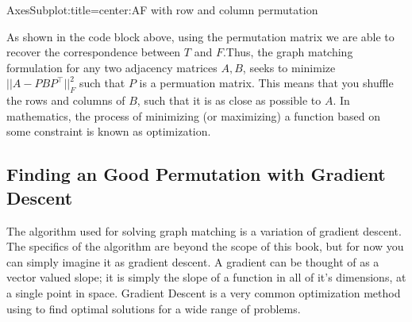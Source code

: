 \documentclass[letterpaper,10pt,english]{jupyterBook}
\begin{document}
\begin{sphinxVerbatim}[commandchars=\\\{\}]
      
 \PYG{p}{[}\PYG{p}{]}    
 \PYG{p}{[}\PYG{p}{]}    
 \PYG{p}{[}\PYG{p}{]}    
\end{sphinxVerbatim}

\begin{sphinxVerbatim}[commandchars=\\\{\}]
\PYGZlt{}AxesSubplot:title=\PYGZob{}\PYGZsq{}center\PYGZsq{}:\PYGZsq{}\PYGZdl{}A\PYGZus{}F\PYGZdl{} with row and column permutation\PYGZsq{}\PYGZcb{}\PYGZgt{}
\end{sphinxVerbatim}

\noindent{}

\sphinxAtStartPar
As shown in the code block above, using the permutation matrix we are able to recover the correspondence between \(T\) and \(F\).Thus, the graph matching formulation for any two adjacency matrices \(A, B\), seeks to minimize \(|| A - PBP^\intercal||_F^2\) such that \(P\) is a permuation matrix. This means that you shuffle the rows and columns of \(B\), such that it is as close as possible to \(A\). In mathematics, the process of minimizing (or maximizing) a function based on some constraint is known as optimization.


\subsection{Finding an Good Permutation with Gradient Descent}
\label{\detokenize{applications/ch9/graph-matching-vertex:finding-an-good-permutation-with-gradient-descent}}
\sphinxAtStartPar
The algorithm used for solving graph matching is a variation of gradient descent.  The specifics of the algorithm are beyond the scope of this book, but for now you can simply imagine it as gradient descent. A gradient can be thought of as a vector valued slope; it is simply the slope of a function in all of it’s dimensions, at a single point in space. Gradient Descent is a very common optimization method using to find optimal solutions for a wide range of problems.
\end{document}
